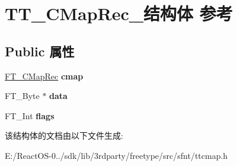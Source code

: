 \hypertarget{struct_t_t___c_map_rec__}{}\section{T\+T\+\_\+\+C\+Map\+Rec\+\_\+结构体 参考}
\label{struct_t_t___c_map_rec__}
\subsection*{Public 属性}
\begin{DoxyCompactItemize}
\item 
\mbox{\label{struct_t_t___c_map_rec___a77a7d03ad178a6acf63331d08b1297c5}} 
\hyperlink{struct_f_t___c_map_rec__}{F\+T\+\_\+\+C\+Map\+Rec} {\bfseries cmap}
\item 
\mbox{\label{struct_t_t___c_map_rec___a89a04acf15df8e457be5a8509008f4a5}} 
F\+T\+\_\+\+Byte $\ast$ {\bfseries data}
\item 
\mbox{\label{struct_t_t___c_map_rec___a85e2c31bb5858298ae9e8f708438e5ce}} 
F\+T\+\_\+\+Int {\bfseries flags}
\end{DoxyCompactItemize}


该结构体的文档由以下文件生成\+:\begin{DoxyCompactItemize}
\item 
E\+:/\+React\+O\+S-\/0../sdk/lib/3rdparty/freetype/src/sfnt/ttcmap.\+h\end{DoxyCompactItemize}

